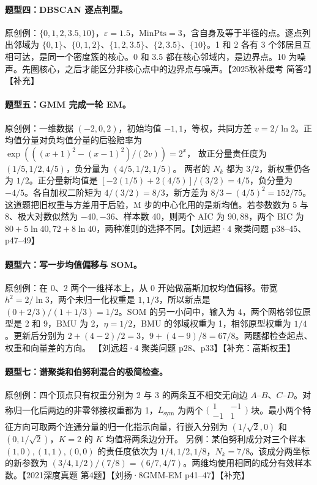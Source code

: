 \documentclass[UTF8,a4paper,zihao=-4,fontset=fandol]{ctexrep}
\begin{document}
\paragraph{题型四：DBSCAN 逐点判型。}
原创例：$\{0,1,2,3.5,10\}$，$\varepsilon=1.5$，$\mathrm{MinPts}=3$，含自身及等于半径的点。逐点列出邻域为 $\{0,1\}$、$\{0,1,2\}$、$\{1,2,3.5\}$、$\{2,3.5\}$、$\{10\}$。1 和 2 各有 3 个邻居且互相可达，是同一个密度簇的核心。0 和 3.5 都在核心邻域内，是边界点。10 为噪声。先圈核心，之后才能区分非核心点中的边界点与噪声。【2025秋补缓考 简答2】【补充】

\paragraph{题型五：GMM 完成一轮 EM。}
原创例：一维数据 $(-2,0,2)$，初始均值 $-1,1$，等权，共同方差 $v=2/\ln 2$。正均值分量对负均值分量的后验赔率为
$\exp(((x+1)^2-(x-1)^2)/(2v))=2^x$，
故正分量责任度为 $(1/5,1/2,4/5)$，负分量为 $(4/5,1/2,1/5)$。
两者的 $N_k$ 都为 $3/2$，新权重仍各为 $1/2$。正分量新均值是 $[-2(1/5)+2(4/5)]/(3/2)=4/5$，负分量为 $-4/5$。各自加权二阶矩为 $4/(3/2)=8/3$，新方差为 $8/3-(4/5)^2=152/75$。这道题把旧权重与方差用于后验，M 步的中心化用的是新均值。若参数数为 5 与 8、极大对数似然为 $-40,-36$、样本数 40，则两个 AIC 为 $90,88$，两个 BIC 为 $80+5\ln40,72+8\ln40$，两种准则的选择不同。【刘远超·4 聚类问题 p38–45、p47–49】

\paragraph{题型六：写一步均值偏移与 SOM。}
原创例：在 0、2 两个一维样本上，从 0 开始做高斯加权均值偏移。带宽 $h^2=2/\ln3$，两个未归一化权重是 $1,1/3$，所以新点是 $(0+2/3)/(1+1/3)=1/2$。SOM 的另一小问中，输入为 4，两个网格邻位原型是 2 和 9，BMU 为 2，$\eta=1/2$，BMU 的邻域权重为 1，相邻原型权重为 $1/4$。更新后分别为 $2+(4-2)/2=3$，$9+(4-9)/8=67/8$。两题都检查起点、权重和向量差的方向。 【刘远超·4 聚类问题 p28、p33】【补充：高斯权重】

\paragraph{题型七：谱聚类和伯努利混合的极简检查。}
原创例：四个顶点只有权重分别为 2 与 3 的两条互不相交无向边 $A$--$B$、$C$--$D$。对称归一化后两边的非零邻接权重都为 1，$L_{\mathrm{sym}}$ 为两个 $\bigl(\begin{smallmatrix}1&-1\\-1&1\end{smallmatrix}\bigr)$ 块。最小两个特征方向可取两个连通分量的归一化指示向量，行嵌入分别为 $(1/\sqrt2,0)$ 和 $(0,1/\sqrt2)$，$K=2$ 的 $K$ 均值将两条边分开。
另例：某伯努利成分对三个样本 $(1,0),(1,1),(0,0)$ 的责任度依次为 $1/4,1/2,1/8$，$N_k=7/8$。该成分两坐标的新参数为 $(3/4,1/2)/(7/8)=(6/7,4/7)$。两维均使用相同的成分有效样本数。【2021深度真题 第4题】【刘扬·8GMM-EM p41–47】【补充】
\end{document}
